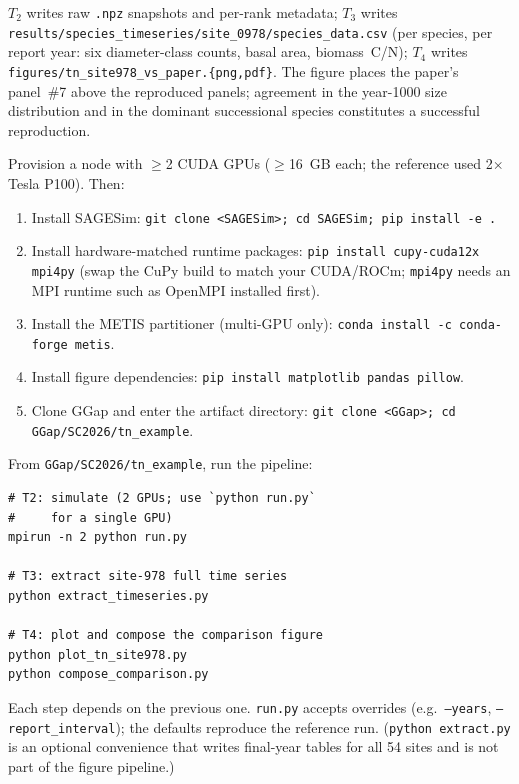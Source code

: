 \documentclass[conference]{IEEEtran}
\begin{document}
\artout

$T_2$ writes raw \texttt{.npz} snapshots and per-rank metadata; $T_3$ writes
\texttt{results/species\_timeseries/site\_0978/species\_data.csv} (per species, per
report year: six diameter-class counts, basal area, biomass~C/N); $T_4$ writes
\texttt{figures/tn\_site978\_vs\_paper.\{png,pdf\}}. The figure places the paper's
panel~\#7 above the reproduced panels; agreement in the year-1000 size distribution and
in the dominant successional species constitutes a successful reproduction.


\newpage
\appendixAE

\artin

Provision a node with $\geq$2 CUDA GPUs ($\geq$16~GB each; the reference used 2$\times$
Tesla P100). Then:
\begin{enumerate}
\item Install SAGESim: \texttt{git clone <SAGESim>; cd SAGESim; pip install -e .}
\item Install hardware-matched runtime packages:
  \texttt{pip install cupy-cuda12x mpi4py} (swap the CuPy build to match your CUDA/ROCm;
  \texttt{mpi4py} needs an MPI runtime such as OpenMPI installed first).
\item Install the METIS partitioner (multi-GPU only):
  \texttt{conda install -c conda-forge metis}.
\item Install figure dependencies: \texttt{pip install matplotlib pandas pillow}.
\item Clone GGap and enter the artifact directory:
  \texttt{git clone <GGap>; cd GGap/SC2026/tn\_example}.
\end{enumerate}

\artcomp

From \texttt{GGap/SC2026/tn\_example}, run the pipeline:
\begin{verbatim}
# T2: simulate (2 GPUs; use `python run.py`
#     for a single GPU)
mpirun -n 2 python run.py

# T3: extract site-978 full time series
python extract_timeseries.py

# T4: plot and compose the comparison figure
python plot_tn_site978.py
python compose_comparison.py
\end{verbatim}
Each step depends on the previous one. \texttt{run.py} accepts overrides
(e.g.\ \texttt{--years}, \texttt{--report\_interval}); the defaults reproduce the
reference run. (\texttt{python extract.py} is an optional convenience that writes
final-year tables for all 54 sites and is not part of the figure pipeline.)
\end{document}
